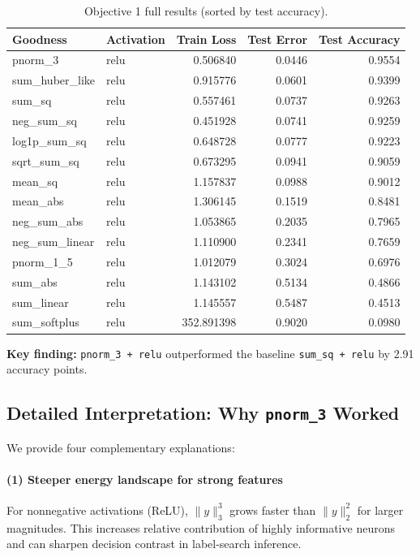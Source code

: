 \documentclass[sigconf]{acmart}
\begin{document}
\begin{table}[t]
\caption{Objective 1 full results (sorted by test accuracy).}
\label{tab:obj1}
\centering
\scriptsize
\begin{tabular}{l l r r r}
\toprule
Goodness & Activation & Train Loss & Test Error & Test Accuracy \\
\midrule
pnorm\_3 & relu & 0.506840 & 0.0446 & 0.9554 \\
sum\_huber\_like & relu & 0.915776 & 0.0601 & 0.9399 \\
sum\_sq & relu & 0.557461 & 0.0737 & 0.9263 \\
neg\_sum\_sq & relu & 0.451928 & 0.0741 & 0.9259 \\
log1p\_sum\_sq & relu & 0.648728 & 0.0777 & 0.9223 \\
sqrt\_sum\_sq & relu & 0.673295 & 0.0941 & 0.9059 \\
mean\_sq & relu & 1.157837 & 0.0988 & 0.9012 \\
mean\_abs & relu & 1.306145 & 0.1519 & 0.8481 \\
neg\_sum\_abs & relu & 1.053865 & 0.2035 & 0.7965 \\
neg\_sum\_linear & relu & 1.110900 & 0.2341 & 0.7659 \\
pnorm\_1\_5 & relu & 1.012079 & 0.3024 & 0.6976 \\
sum\_abs & relu & 1.143102 & 0.5134 & 0.4866 \\
sum\_linear & relu & 1.145557 & 0.5487 & 0.4513 \\
sum\_softplus & relu & 352.891398 & 0.9020 & 0.0980 \\
\bottomrule
\end{tabular}
\end{table}

\textbf{Key finding:} \texttt{pnorm\_3 + relu} outperformed the baseline \texttt{sum\_sq + relu} by 2.91 accuracy points.

\subsection{Detailed Interpretation: Why \texttt{pnorm\_3} Worked}
We provide four complementary explanations:

\paragraph{(1) Steeper energy landscape for strong features}
For nonnegative activations (ReLU), \(\|y\|_3^3\) grows faster than \(\|y\|_2^2\) for larger magnitudes. This increases relative contribution of highly informative neurons and can sharpen decision contrast in label-search inference.
\end{document}
